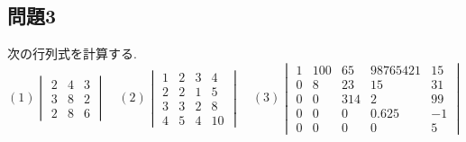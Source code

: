 \documentclass[a4j,dvipdfmx]{jsarticle}
\begin{document}
    \subsection*{問題3}
        次の行列式を計算する.
        \begin{equation*}
            (1)\begin{vmatrix}
                2 & 4 & 3 \\
                3 & 8 & 2\\
                2 & 8 & 6
            \end{vmatrix}\quad
            (2)\begin{vmatrix}
                1 & 2 & 3 & 4\\
                2 & 2 & 1 & 5\\
                3 & 3 & 2 & 8\\
                4 & 5 & 4 & 10
            \end{vmatrix}\quad
            (3)\begin{vmatrix}
                1 & 100 & 65 & 98765421 & 15\\
                0 & 8 & 23 & 15 & 31\\
                0 & 0 & 314 & 2 & 99\\
                0 & 0 & 0 & 0.625 & -1\\
                0 & 0 & 0 & 0 &  5
            \end{vmatrix}
        \end{equation*}
\end{document}
